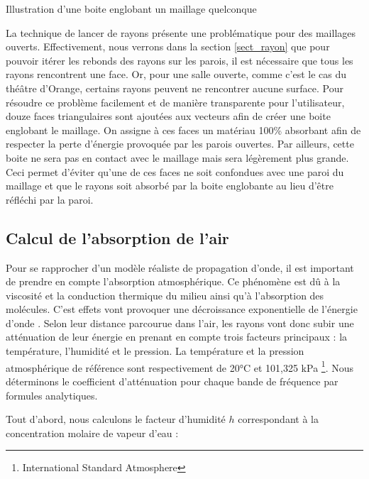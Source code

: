 \begin{figureth}
\begin{subfigureth}{0.35\textwidth}
		\label{boiteenglobante2}
	\end{subfigureth}
	\caption{Illustration d'une boite englobant un maillage quelconque}
\end{figureth}

La technique de lancer de rayons présente une problématique pour des maillages ouverts. Effectivement, nous verrons dans la section \ref{sect_rayon} que pour pouvoir itérer les rebonds des rayons sur les parois, il est nécessaire que tous les rayons rencontrent une face. Or, pour une salle ouverte, comme c'est le cas du théâtre d'Orange, certains rayons peuvent ne rencontrer aucune surface. Pour résoudre ce problème facilement et de manière transparente pour l'utilisateur, douze faces triangulaires sont ajoutées aux vecteurs afin de créer une boite englobant le maillage. On assigne à ces faces un matériau 100\% absorbant afin de respecter la perte d'énergie provoquée par les parois ouvertes. Par ailleurs, cette boite ne sera pas en contact avec le maillage mais sera légèrement plus grande. Ceci permet d'éviter qu'une de ces faces ne soit confondues avec une paroi du maillage et que le rayons soit absorbé par la boite englobante au lieu d'être réfléchi par la paroi.

\subsection{Calcul de l'absorption de l'air}
Pour se rapprocher d'un modèle réaliste de propagation d'onde, il est important de prendre en compte l'absorption atmosphérique. Ce phénomène est dû à la viscosité et la conduction thermique du milieu ainsi qu'à l'absorption des molécules. C'est effets vont provoquer une décroissance exponentielle de l'énergie d'onde \cite[p. 68-70]{jouhaneau}. Selon leur distance parcourue dans l'air, les rayons vont donc subir une atténuation de leur énergie en prenant en compte trois facteurs principaux : la température, l'humidité et le pression. La température et la pression atmosphérique de référence sont respectivement de 20°C et 101,325 kPa \footnote{International Standard Atmosphere}. Nous déterminons le coefficient d'atténuation pour chaque bande de fréquence par formules analytiques. 

Tout d'abord, nous calculons le facteur d'humidité $h$ correspondant à la concentration molaire de vapeur d'eau \cite[Annexe B, B.1]{iso} :

